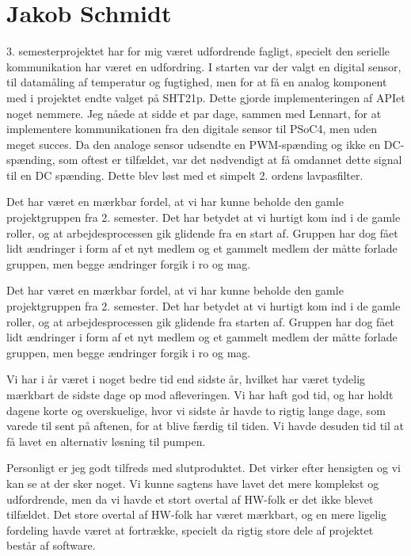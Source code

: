 \section{Jakob Schmidt}

3. semesterprojektet har for mig været udfordrende fagligt, specielt den serielle kommunikation har været en udfordring. I starten var der valgt en digital sensor, til datamåling af temperatur og fugtighed, men for at få en analog komponent med i projektet endte valget på SHT21p. Dette gjorde implementeringen af APIet noget nemmere. Jeg nåede at sidde et par dage, sammen med Lennart, for at implementere kommunikationen fra den digitale sensor til PSoC4, men uden meget succes. 
Da den analoge sensor udsendte en PWM-spænding og ikke en DC-spænding, som oftest er tilfældet, var det nødvendigt at få omdannet dette signal til en DC spænding. Dette blev løst med et simpelt 2. ordens lavpasfilter. 




Det har været en mærkbar fordel, at vi har kunne beholde den gamle projektgruppen fra 2. semester. Det har betydet at vi hurtigt kom ind i de gamle roller, og at arbejdesprocessen gik glidende fra en start af. Gruppen har dog fået lidt ændringer i form af et nyt medlem og et gammelt medlem der måtte forlade gruppen, men begge ændringer forgik i ro og mag.

Det har været en mærkbar fordel, at vi har kunne beholde den gamle projektgruppen fra 2. semester. Det har betydet at vi hurtigt kom ind i de gamle roller, og at arbejdesprocessen gik glidende fra starten af. Gruppen har dog fået lidt ændringer i form af et nyt medlem og et gammelt medlem der måtte forlade gruppen, men begge ændringer forgik i ro og mag.


Vi har i år været i noget bedre tid end sidste år, hvilket har været tydelig mærkbart de sidste dage op mod afleveringen. Vi har haft god tid, og har holdt dagene korte og overskuelige, hvor vi sidste år havde to rigtig lange dage, som varede til sent på aftenen, for at blive færdig til tiden. 
Vi havde desuden tid til at få lavet en alternativ løsning til pumpen.

Personligt er jeg godt tilfreds med slutproduktet. Det virker efter hensigten og vi kan se at der sker noget. Vi kunne sagtens have lavet det mere komplekst og udfordrende, men da vi havde et stort overtal af HW-folk er det ikke blevet tilfældet. Det store overtal af HW-folk har været mærkbart, og en mere ligelig fordeling havde været at fortrække, specielt da rigtig store dele af projektet består af software. 
